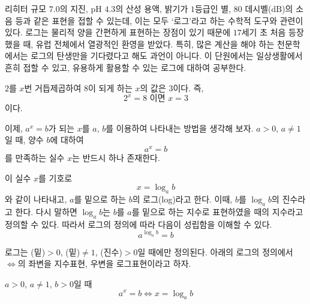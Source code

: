 \documentclass[11pt, a4paper]{book}
\newcommand{\tikzmark}[3][]{\tikz[overlay,remember picture,baseline] \node 
	[anchor=base,#1](#2) {#3};}
\begin{document}
	리히터 규모 $7.0$의 지진, $\textrm{pH}$ $4.3$의 산성 용액, 밝기가 $1$등급인 별, $80$ 데시벨($\textrm{dB}$)의 소음 등과 같은 표현을 접할 수 있는데, 이는 모두 ‘로그’라고 하는 수학적 도구와 관련이 있다. 로그는 물리적 양을 간편하게 표현하는 장점이 있기 때문에 $17$세기 초 처음 등장했을 때, 유럽 전체에서 열광적인 환영을 받았다. 특히, 많은 계산을 해야 하는 천문학에서는 로그의 탄생만을 기다렸다고 해도 과언이 아니다. 이 단원에서는 일상생활에서 흔히 접할 수 있고, 유용하게 활용할 수 있는 로그에 대하여 공부한다.
	
%	

$2$를 $x$번 거듭제곱하여 $8$이 되게 하는 $x$의 값은 $3$이다. 즉,
\[
2^{x}=8 \text{ 이면 } x=3
\]
이다.

이제, $a^{x}=b$가 되는 $x$를 $a$, $b$를 이용하여 나타내는 방법을 생각해 보자.
$a>0$, $a\ne 1$일 때, 양수 $b$에 대하여
\[
a^{x}=b
\]
를 만족하는 실수 $x$는 반드시 하나 존재한다.

이 실수 $x$를 기호로
\[
x=\log_{a} b
\]
와 같이 나타내고, $a$를 {\color{red}밑}으로 하는 $b$의 {\color{red}로그(log)}라고 한다. 
이때, $b$를 $\log_{a}b$의 {\color{red}진수}라고 한다. 다시 말하면 $\log_{a} b$는 $b$를 $a$를 밑으로 하는 지수로 표현하였을 때의 지수라고 정의할 수 있다. 따라서 로그의 정의에 따라 다음이 성립함을 이해할 수 있다.
\[
 a^{\log_{a} b} = b
\]

로그는 {\color{blue} (밑)$>0$, (밑)$\ne 1$, (진수)$>0$}일 때에만 정의된다.  아래의 로그의 정의에서 $\Leftrightarrow$의 좌변을 {\color{red}지수표현}, 우변을 {\color{red}로그표현}이라고 하자.
\begin{definition}[로그의 정의]\vspace{-0.5em}
	$a>0$, $a \ne 1$, $b>0$일 때 
\[
	a^{x}=b  \Leftrightarrow x=\log_{a}b
\]	
\end{definition}
\end{document}
